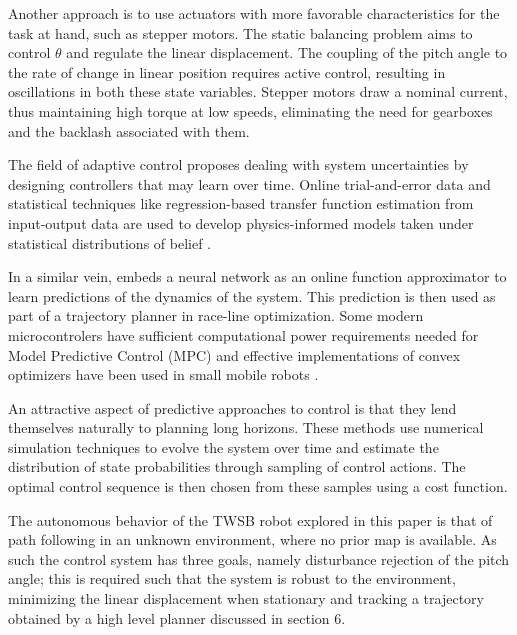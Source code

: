         Another approach is to use actuators with more favorable characteristics for the task at hand, such as stepper motors.
        The static balancing problem aims to control $\theta$ and regulate the linear displacement. The coupling of the 
        pitch angle to the rate of change in linear position requires active control, resulting in oscillations in both these state variables. 
        Stepper motors draw a nominal current, thus maintaining high torque at low speeds, eliminating the need for gearboxes and the 
        backlash associated with them. 
            
        The field of adaptive control proposes dealing with system uncertainties by designing controllers that may 
        learn over time. Online trial-and-error data and statistical techniques like regression-based transfer
        function estimation from input-output data are used to develop physics-informed models taken under statistical 
        distributions of belief \cite{benosman2018model}.         
                
        In a similar vein, \cite{williams2016aggressive} embeds a neural network as an online function approximator to learn 
        predictions of the dynamics of the system. This prediction is then used as part of a trajectory planner in race-line optimization. 
        Some modern microcontrolers have sufficient computational power requirements needed for Model Predictive Control (MPC) and 
        effective implementations of convex optimizers \cite{nguyen2024tinympc} have been used in small mobile robots \cite{giernacki2017crazyflie}.
            
        An attractive aspect of predictive approaches to control is that they lend themselves naturally to 
        planning long horizons. These methods use numerical simulation techniques to evolve the system over time 
        and estimate the distribution of state probabilities through sampling of control actions. 
        The optimal control sequence is then chosen from these samples using a cost function.
                
        The autonomous behavior of the TWSB robot explored in this paper is that of path 
        following in an unknown environment, where no prior map is available. As such the 
        control system has three goals, namely disturbance rejection of the pitch angle; 
        this is required such that the system is robust to the environment, minimizing 
        the linear displacement when stationary and tracking a trajectory obtained by a 
        high level planner discussed in section 6. 

